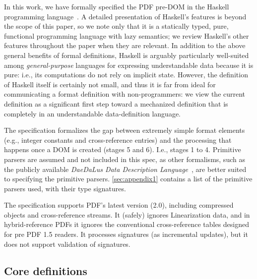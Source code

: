 In this work, we have formally specified the PDF pre-DOM
in the Haskell programming language~\cite{jones2003haskell}.
%
A detailed presentation of Haskell's features is beyond the scope of
this paper, so we note only that it is a statically typed, pure,
functional programming language with lazy semantics;
%
we review Haskell's other features throughout the paper when they are
relevant.
In addition to the above general benefits of formal definitions, Haskell is arguably particularly well-suited among \emph{general-purpose} languages for expressing understandable data because it is pure: i.e., its computations do not rely on implicit state.
However, the definition of Haskell itself is certainly not small, and thus it is far from ideal for communicating a format definition with non-programmers: we view the current definition as a significant first step toward a mechanized definition that is completely in an understandable data-definition language. 

The specification formalizes the gap between extremely simple format elements (e.g., integer constants and cross-reference entries) and the
processing that happens once a DOM is created (stages 5 and 6).
%
I.e., stages 1 to 4.
%
Primitive parsers are assumed and not included in this spec, as other
formalisms, such as the publicly available \emph{DaeDaLus Data Description
  Language}~\cite{daedalusrepo}, are better suited to specifying the
primitive parsers.
%
\cref{sec:appendix1} contains a list of the primitive parsers used,
with their type signatures.

The specification supports PDF's latest version (2.0), including compressed objects and cross-reference streams.
%
It (safely) ignores Linearization data, and in hybrid-reference PDFs
it ignores the conventional cross-reference tables designed for pre PDF 1.5 readers.
It processes signatures (as incremental updates), but it does not support
validation of signatures.

\subsection{Core definitions}
\label{sec:core}
\iffalse
\begin{code}
{-# LANGUAGE EmptyDataDecls, TypeOperators, LambdaCase #-}
module Spec where
import           Control.Monad
import           Data.Char
import           Data.Foldable(foldlM)
import qualified Data.IntSet as IntSet
import           Data.List
import qualified Data.Map as M
import           Data.Map(Map)
import           Types hiding (XRefEntry,SEEK,Update) -- defs dupd here!
import           Utils
import           Primitives
import           Streams
\end{code}
\fi

